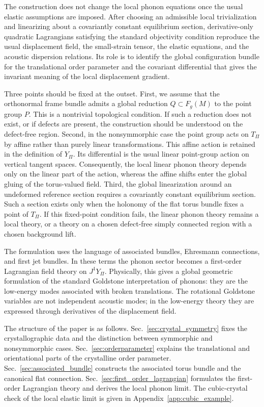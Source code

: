 \documentclass[11pt]{amsart}
\theoremstyle{plain}
\theoremstyle{definition}
\theoremstyle{remark}
\begin{document}
The construction does not change the local phonon equations once the usual elastic assumptions are imposed. After choosing an admissible local trivialization and linearizing about a covariantly constant equilibrium section, derivative-only quadratic Lagrangians satisfying the standard objectivity condition reproduce the usual displacement field, the small-strain tensor, the elastic equations, and the acoustic dispersion relations.
Its role is to identify the global configuration bundle for the translational order parameter and the covariant differential that gives the invariant meaning of the local displacement gradient.

Three points should be fixed at the outset. 
First, we assume that the orthonormal frame bundle admits a global reduction \(Q\subset F_g(M)\) to the point group \(P\). 
This is a nontrivial topological condition. If such a reduction does not exist, or if defects are present, the construction should be understood on the defect-free region. 
Second, in the nonsymmorphic case the point group acts on \(T_\Pi\) by affine rather than purely linear transformations. 
This affine action is retained in the definition of \(Y_\Pi\). 
Its differential is the usual linear point-group action on vertical tangent spaces. 
Consequently, the local linear phonon theory depends only on the linear part of the action, whereas the affine shifts enter the global gluing of the torus-valued field. 
Third, the global linearization around an undeformed reference section requires a covariantly constant equilibrium section. Such a section exists only when the holonomy of the flat torus bundle fixes a point of \(T_\Pi\). If this fixed-point condition fails, the linear phonon theory remains a local theory, or a theory on a chosen defect-free simply connected region with a chosen background lift.

The formulation uses the language of associated bundles, Ehresmann connections, and first jet bundles. 
In these terms the phonon sector becomes a first-order Lagrangian field theory on \(J^1Y_\Pi\). 
Physically, this gives a global geometric formulation of the standard Goldstone interpretation of phonons: they are the low-energy modes associated with broken translations. 
The rotational Goldstone variables are not independent acoustic modes; in the low-energy theory they are expressed through derivatives of the displacement field.

The structure of the paper is as follows. Sec.~\ref{sec:crystal_symmetry} fixes the crystallographic data and the distinction between symmorphic and nonsymmorphic cases. Sec.~\ref{sec:orderparameter} explains the translational and orientational parts of the crystalline order parameter. Sec.~\ref{sec:associated_bundle} constructs the associated torus bundle and the canonical flat connection. Sec.~\ref{sec:first_order_lagrangian} formulates the first-order Lagrangian theory and derives the local phonon limit. The cubic-crystal check of the local elastic limit is given in Appendix~\ref{app:cubic_example}.
\end{document}
